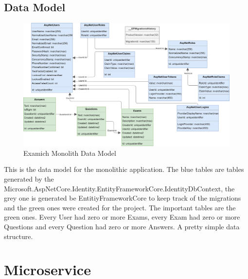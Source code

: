 \documentclass[BIF,Bachelor,nenglish]{twbook}%
\begin{document}
\subsection{Data Model}

\begin{figure} [H]
 \begin{center}
    \includegraphics[width=1.1\linewidth]{img/ExamichDataModel.png}
 \end{center}
 \caption{Examich Monolith Data Model}
 \label{datamodel}
\end{figure}

This is the data model for the monolithic application. The blue tables are tables generated by the Microsoft.AspNetCore.Identity.EntityFrameworkCore.IdentityDbContext, the grey one is generated be EntitiyFrameworkCore to keep track of the migrations and the green ones were created for the project. The important tables are the green ones. Every User had zero or more Exams, every Exam had zero or more Questions and every Question had zero or more Answers. A pretty simple data structure.


\section{Microservice}
\end{document}
